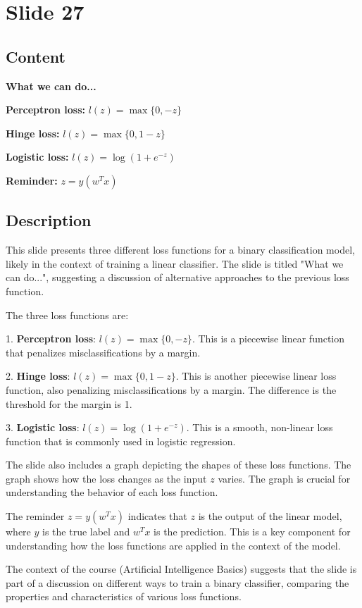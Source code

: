 \documentclass{article}%
\begin{document}
%
\newpage%
\section{Slide 27}%
\label{sec:Slide27}%
\subsection{Content}%

\textbf{What we can do...}

\textbf{Perceptron loss:}
$l(z) = \max\{0, -z\}$

\textbf{Hinge loss:}
$l(z) = \max\{0, 1 - z\}$

\textbf{Logistic loss:}
$l(z) = \log(1 + e^{-z})$

\textbf{Reminder:}
$z = y(w^Tx)$
%
\subsection{Description}%
This slide presents three different loss functions for a binary classification model, likely in the context of training a linear classifier.  The slide is titled "What we can do...", suggesting a discussion of alternative approaches to the previous loss function.

The three loss functions are:

1.  \textbf{Perceptron loss}: $l(z) = \max\{0, -z\}$.  This is a piecewise linear function that penalizes misclassifications by a margin.

2.  \textbf{Hinge loss}: $l(z) = \max\{0, 1 - z\}$.  This is another piecewise linear loss function, also penalizing misclassifications by a margin.  The difference is the threshold for the margin is 1.

3.  \textbf{Logistic loss}: $l(z) = \log(1 + e^{-z})$. This is a smooth, non-linear loss function that is commonly used in logistic regression.

The slide also includes a graph depicting the shapes of these loss functions.  The graph shows how the loss changes as the input $z$ varies.  The graph is crucial for understanding the behavior of each loss function.

The reminder $z = y(w^Tx)$ indicates that $z$ is the output of the linear model, where $y$ is the true label and $w^Tx$ is the prediction.  This is a key component for understanding how the loss functions are applied in the context of the model.

The context of the course (Artificial Intelligence Basics) suggests that the slide is part of a discussion on different ways to train a binary classifier, comparing the properties and characteristics of various loss functions.%
\end{document}
